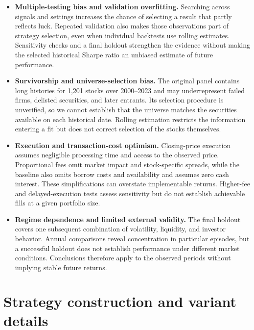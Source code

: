 \documentclass[11pt,letterpaper]{article}
\begin{document}
\begin{itemize}
    \item \textbf{Multiple-testing bias and validation overfitting.}
    Searching across signals and settings increases the chance of selecting
    a result that partly reflects luck. Repeated validation also makes
    those observations part of strategy selection, even when individual
    backtests use rolling estimates. Sensitivity checks and a final holdout
    strengthen the evidence without making the selected historical Sharpe
    ratio an unbiased estimate of future performance.

    \item \textbf{Survivorship and universe-selection bias.} The original
    panel contains long histories for 1,201 stocks over 2000--2023 and may
    underrepresent failed firms, delisted securities, and later entrants.
    Its selection procedure is unverified, so we cannot establish that
    the universe matches the securities available on each historical date.
    Rolling estimation restricts the information entering a fit but does
    not correct selection of the stocks themselves.

    \item \textbf{Execution and transaction-cost optimism.} Closing-price
    execution assumes negligible processing time and access to the observed
    price. Proportional fees omit market impact and stock-specific spreads,
    while the baseline also omits borrow costs and availability and assumes
    zero cash interest. These simplifications can overstate implementable
    returns. Higher-fee and delayed-execution tests assess sensitivity but
    do not establish achievable fills at a given portfolio size.

    \item \textbf{Regime dependence and limited external validity.} The
    final holdout covers one subsequent combination of volatility, liquidity,
    and investor behavior. Annual comparisons reveal concentration in
    particular episodes, but a successful holdout does not establish
    performance under different market conditions. Conclusions therefore
    apply to the observed periods without implying stable future returns.
\end{itemize}

\section{Strategy construction and variant details}
\label{app:strategies}
\end{document}
